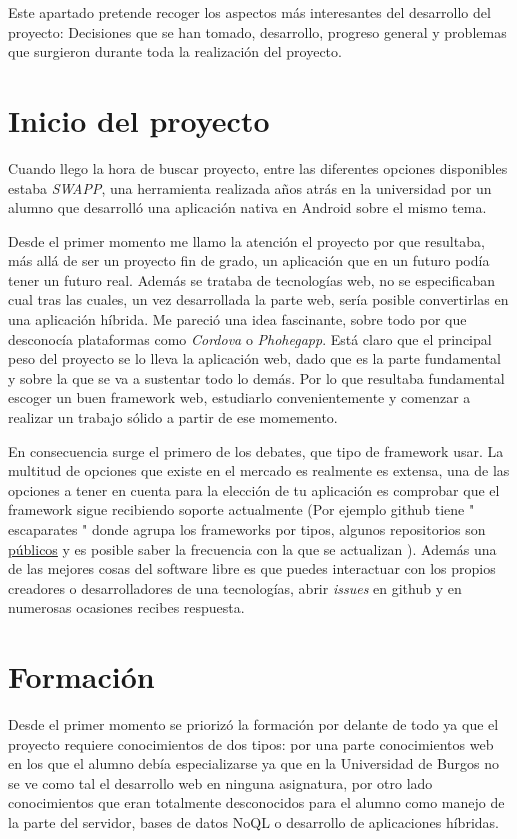 
Este apartado pretende recoger los aspectos más interesantes del desarrollo del proyecto: Decisiones que se han tomado, desarrollo, progreso general y problemas que surgieron durante toda la realización del proyecto.


\section{Inicio del proyecto}\label{inicio-proyecto}
Cuando llego la hora de buscar proyecto, entre las  diferentes opciones disponibles estaba \emph{SWAPP}, una herramienta realizada años atrás en la universidad por un alumno que desarrolló una aplicación nativa en Android sobre el mismo tema.

 Desde el primer momento me llamo la atención el proyecto por que resultaba, más allá de ser un proyecto fin de grado, un aplicación que en un futuro podía tener un futuro real. Además se trataba de tecnologías web, no se especificaban cual tras las cuales, un vez desarrollada la parte web, sería posible convertirlas en una aplicación híbrida. Me pareció una idea fascinante, sobre todo por que desconocía plataformas como \emph{Cordova} o \emph{Phohegapp}. Está claro que el principal peso del proyecto se lo lleva la aplicación web, dado que es la parte fundamental y sobre la que se va a sustentar todo lo demás. Por lo que resultaba fundamental escoger un buen framework web, estudiarlo convenientemente y comenzar a realizar un trabajo sólido a partir de ese momemento.
 
  En consecuencia surge el primero de los debates, que tipo de framework usar. La multitud de opciones que existe en el mercado es realmente es extensa, una de las opciones a tener en cuenta para la elección de tu aplicación es comprobar que el framework sigue recibiendo soporte actualmente (Por ejemplo github tiene " escaparates " donde agrupa los frameworks por tipos, algunos repositorios son \hyperlink{ https://github.com/showcases/web-application-frameworks/}{públicos}  y es posible saber la frecuencia con la que se actualizan ). Además una de las mejores cosas del software libre es que puedes interactuar con los propios creadores  o desarrolladores de una tecnologías, abrir \emph{issues} en github y en numerosas ocasiones recibes respuesta. 
  
  
  \section{Formación}\label{formacion}
Desde el primer momento se priorizó la formación por delante de todo ya que el proyecto requiere conocimientos de dos tipos: por una parte conocimientos web en los que el alumno debía especializarse ya que en la Universidad de Burgos no se ve como tal el desarrollo web en ninguna asignatura, por otro lado conocimientos que eran totalmente desconocidos para el alumno como manejo de la parte del servidor, bases de datos NoQL o desarrollo de aplicaciones híbridas. 

